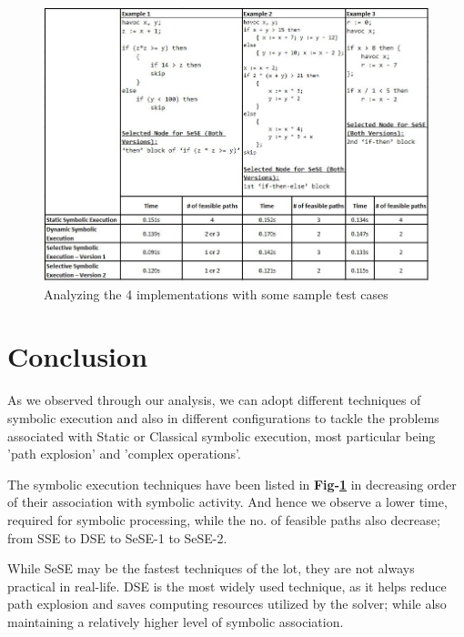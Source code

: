 \documentclass[11pt]{llncs}
\begin{document}
	\vspace{-4mm}

	\begin{figure}[H]
		\includegraphics[width=1.1\textwidth]{Analysis.JPG}
		\caption{Analyzing the 4 implementations with some sample test cases} \label{fig_7}
	\end{figure}

	\vspace{-5mm}

\section{Conclusion}
	As we observed through our analysis, we can adopt different techniques of symbolic execution and also in different configurations to tackle the problems associated with Static or Classical symbolic execution, most particular being 'path explosion' and 'complex operations'.

	\vspace{2mm}

	The symbolic execution techniques have been listed in \textbf{Fig-\ref{fig_7}} in decreasing order of their association with symbolic activity. And hence we observe a lower time, required for symbolic processing, while the no. of feasible paths also decrease; from SSE to DSE to SeSE-1 to SeSE-2.

	\vspace{2mm}

	While SeSE may be the fastest techniques of the lot, they are not always practical in real-life. DSE is the most widely used technique, as it helps reduce path explosion and saves computing resources utilized by the solver; while also maintaining a relatively higher level of symbolic association.
\end{document}
